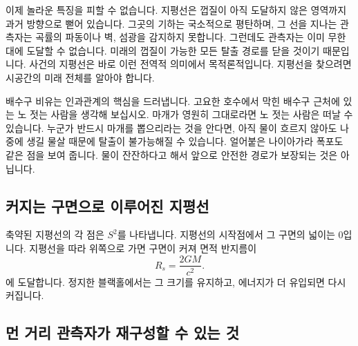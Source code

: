 이제 놀라운 특징을 피할 수 없습니다. 지평선은 껍질이 아직 도달하지 않은 영역까지 과거 방향으로 뻗어 있습니다. 그곳의 기하는 국소적으로 평탄하며, 그 선을 지나는 관측자는 곡률의 파동이나 벽, 섬광을 감지하지 못합니다. 그런데도 관측자는 이미 무한대에 도달할 수 없습니다. 미래의 껍질이 가능한 모든 탈출 경로를 닫을 것이기 때문입니다. 사건의 지평선은 바로 이런 전역적 의미에서 목적론적입니다. 지평선을 찾으려면 시공간의 미래 전체를 알아야 합니다.

배수구 비유는 인과관계의 핵심을 드러냅니다. 고요한 호수에서 막힌 배수구 근처에 있는 노 젓는 사람을 생각해 보십시오. 마개가 영원히 그대로라면 노 젓는 사람은 떠날 수 있습니다. 누군가 반드시 마개를 뽑으리라는 것을 안다면, 아직 물이 흐르지 않아도 나중에 생길 물살 때문에 탈출이 불가능해질 수 있습니다. 얼어붙은 나이아가라 폭포도 같은 점을 보여 줍니다. 물이 잔잔하다고 해서 앞으로 안전한 경로가 보장되는 것은 아닙니다.

\begin{classroomqa}
\end{classroomqa}

\subsection{커지는 구면으로 이루어진 지평선}

축약된 지평선의 각 점은 \(S^2\)를 나타냅니다. 지평선의 시작점에서 그 구면의 넓이는 0입니다. 지평선을 따라 위쪽으로 가면 구면이 커져 면적 반지름이
\begin{equation}
R_s=\frac{2GM}{c^2}.
\end{equation}
에 도달합니다. 정지한 블랙홀에서는 그 크기를 유지하고, 에너지가 더 유입되면 다시 커집니다.


\subsection{먼 거리 관측자가 재구성할 수 있는 것}

